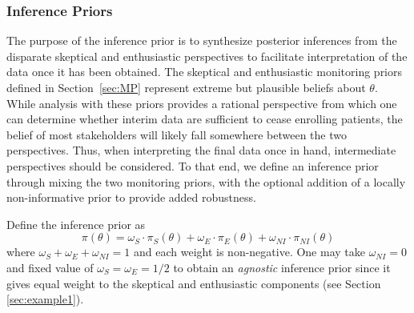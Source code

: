 \documentclass[useAMS,usenatbib,referee]{biom}
\begin{document}
\subsubsection{Inference Priors}\label{sec:inferencepriors}
The purpose of the inference prior is to synthesize posterior inferences from the disparate skeptical and enthusiastic perspectives to 
facilitate interpretation of the data once it has been obtained. 
%
The skeptical and enthusiastic monitoring priors defined in Section~\ref{sec:MP} represent extreme but plausible 
beliefs about $\theta$.
%
While analysis with these priors provides a rational perspective from which one can determine whether interim data 
are sufficient to cease enrolling patients, the belief of most stakeholders will likely fall somewhere between the 
two perspectives.
%
Thus, when interpreting the final data once in hand, intermediate perspectives should be considered.
%
To that end, we define an inference prior through mixing the two monitoring priors, with the optional addition of a locally non-informative prior to provide added robustness.

{
Define the inference prior as
\begin{equation}\label{eq:3partmix}
\pi(\theta)=\omega_S\cdot \pi_S(\theta)+\omega_E\cdot\pi_E(\theta)+\omega_{NI}\cdot\pi_{NI}(\theta)
\end{equation}
where $\omega_S+\omega_E+\omega_{NI}=1$ and each weight is non-negative. 
One may take $\omega_{NI}=0$ and fixed value of $\omega_S=\omega_E=1/2$ to obtain an \textit{agnostic} inference prior since it 
gives equal weight to the skeptical and enthusiastic components (see Section \ref{sec:example1}).
%
}
\end{document}
